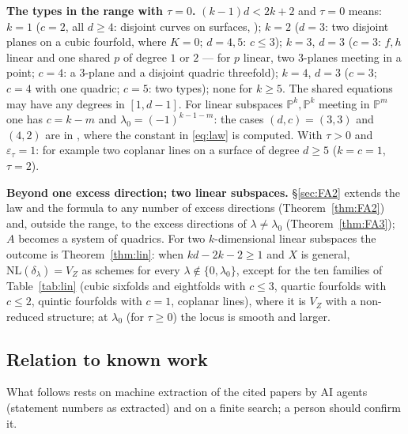 \documentclass[11pt]{article}
\numberwithin{equation}{section}
\theoremstyle{remark}
\newcommand{\PP}{\mathbb{P}}
\newcommand{\NL}{\mathrm{NL}}
\newcommand{\VZ}{V_Z}
\newcommand{\lz}{\lambda_0}
\newcommand{\et}{\varepsilon_\tau}
\newcommand{\run}[1]{\medskip\noindent\textbf{#1}}
\begin{document}
\run{The types in the range with $\tau=0$.} $(k-1)d<2k+2$ and $\tau=0$ means: $k=1$ ($c=2$, all $d\ge4$:
disjoint curves on surfaces, \cite{P2}); $k=2$ ($d=3$: two disjoint planes on a cubic fourfold, where $K=0$;
$d=4,5$: $c\le3$); $k=3$, $d=3$ ($c=3$: $f,h$ linear and one shared $p$ of degree $1$ or $2$ --- for $p$ linear,
two $3$-planes meeting in a point; $c=4$: a $3$-plane and a disjoint quadric threefold); $k=4$, $d=3$ ($c=3$;
$c=4$ with one quadric; $c=5$: two types); none for $k\ge5$. The shared equations may have any degrees in
$[1,d-1]$. For linear subspaces $\PP^k,\PP^k$ meeting in $\PP^m$ one has $c=k-m$ and $\lz=(-1)^{k-1-m}$: the cases
$(d,c)=(3,3)$ and $(4,2)$ are in \cite{P1}, where the constant in \eqref{eq:law} is computed. With $\tau>0$ and
$\et=1$: for example two coplanar lines on a surface of degree $d\ge5$ ($k=c=1$, $\tau=2$).

\run{Beyond one excess direction; two linear subspaces.} \S\ref{sec:FA2} extends the law and the formula to any
number of excess directions (Theorem~\ref{thm:FA2}) and, outside the range, to the excess directions of
$\lambda\ne\lz$ (Theorem~\ref{thm:FA3}); $A$ becomes a system of quadrics. For two $k$-dimensional linear
subspaces the outcome is Theorem~\ref{thm:lin}: when $kd-2k-2\ge1$ and $X$ is general, $\NL(\delta_\lambda)=\VZ$ as
schemes for every $\lambda\notin\{0,\lz\}$, except for the ten families of Table~\ref{tab:lin} (cubic sixfolds and
eightfolds with $c\le3$, quartic fourfolds with $c\le2$, quintic fourfolds with $c=1$, coplanar lines), where
it is $\VZ$ with a non-reduced structure; at $\lz$ (for $\tau\ge0$) the locus is smooth and larger.

\subsection{Relation to known work}\label{sec:lit}
What follows rests on machine extraction of the cited papers by AI agents (statement numbers as extracted) and
on a finite search; a person should confirm it.
\end{document}
